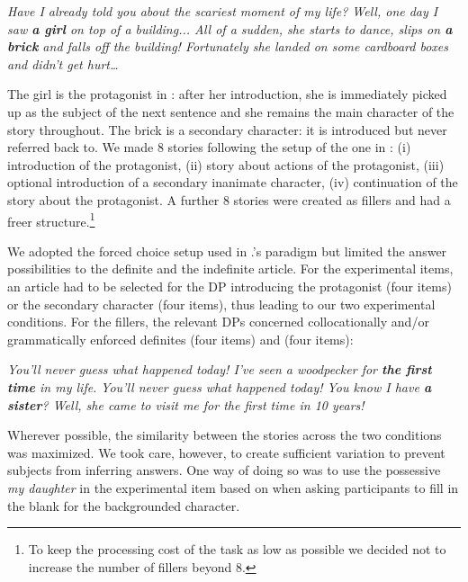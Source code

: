 \documentclass[output=paper,
modfonts
]{langscibook}
\begin{document}
\ea\label{ex:lebruyn:3}

\textit{Have I already told you about the scariest moment of my life? Well, one day I saw \textbf{a girl} on top of a building... All of a sudden, she starts to dance, slips on \textbf{a brick} and falls off the	building! Fortunately she landed on some cardboard boxes and didn’t get hurt…}

\z

The girl is the protagonist in : after her introduction, she is immediately picked up as the subject of the next sentence and she remains the main character of the story throughout. The brick is a secondary character: it is introduced but never referred back to. We made 8 stories following the setup of the one in : (i) introduction of the protagonist, (ii) story about actions of the protagonist, (iii) optional introduction of a secondary inanimate character, (iv) continuation of the story about the protagonist. A further 8 stories were created as fillers and had a freer structure.\footnote{To keep the processing cost of the task as low as possible we decided not to increase the number of fillers beyond 8.}

We adopted the forced choice setup used in \citeauthor{IoninKoWexler2004}.’s  paradigm but limited the answer possibilities to the definite and the indefinite article. For the experimental items, an article had to be selected for the DP introducing the protagonist (four items) or the secondary character (four items), thus leading to our two experimental conditions. For the fillers, the relevant DPs concerned collocationally and/or grammatically enforced definites (four items) and  (four items):

\ea\label{ex:lebruyn:4}
\textit{You’ll never guess what happened today! I’ve seen a woodpecker for \textbf{the first time} in my life.}
\z 
\ea\label{ex:lebruyn:5}
\textit{You’ll never guess what happened today! You know I have \textbf{a sister}? Well, she came to visit 	me for the first time in 10 years!}
\z 

Wherever possible, the similarity between the stories across the two conditions was maximized. We took care, however, to create sufficient variation to prevent subjects from inferring answers. One way of doing so was to use the possessive \textit{my daughter} in the experimental item based on  when asking participants to fill in the blank for the backgrounded character.
\end{document}
